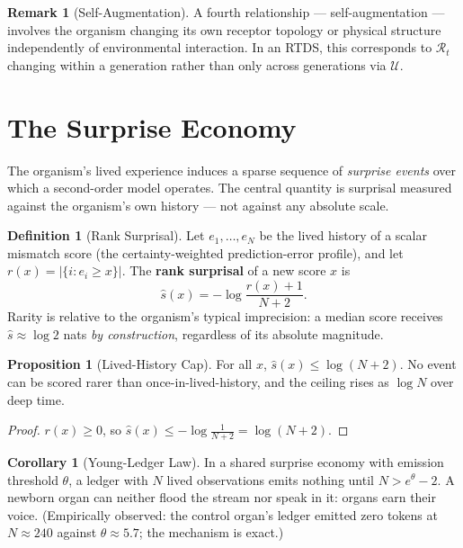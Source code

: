 \documentclass[12pt]{article}
\theoremstyle{definition}
\newtheorem{definition}{Definition}
\newtheorem{proposition}{Proposition}
\newtheorem{corollary}{Corollary}
\newtheorem{remark}{Remark}
\begin{document}
\begin{remark}[Self-Augmentation]
A fourth relationship --- self-augmentation --- involves the organism changing its own
receptor topology or physical structure independently of environmental interaction.
In an RTDS, this corresponds to $\mathcal{R}_t$ changing within a generation rather than
only across generations via $\mathcal{U}$.
\end{remark}

\section{The Surprise Economy}

The organism's lived experience induces a sparse sequence of \emph{surprise events} over
which a second-order model operates. The central quantity is surprisal measured against
the organism's own history --- not against any absolute scale.

\begin{definition}[Rank Surprisal]
Let $e_1, \ldots, e_N$ be the lived history of a scalar mismatch score (the
certainty-weighted prediction-error profile), and let $r(x) = |\{i : e_i \geq x\}|$.
The \textbf{rank surprisal} of a new score $x$ is
\[
\hat{s}(x) = -\log \frac{r(x) + 1}{N + 2}.
\]
Rarity is relative to the organism's typical imprecision: a median score receives
$\hat{s} \approx \log 2$ nats \emph{by construction}, regardless of its absolute magnitude.
\end{definition}

\begin{proposition}[Lived-History Cap]
For all $x$, $\hat{s}(x) \leq \log(N+2)$. No event can be scored rarer than
once-in-lived-history, and the ceiling rises as $\log N$ over deep time.
\end{proposition}
\begin{proof}
$r(x) \geq 0$, so $\hat{s}(x) \leq -\log \frac{1}{N+2} = \log(N+2)$.
\end{proof}

\begin{corollary}[Young-Ledger Law]
In a shared surprise economy with emission threshold $\theta$, a ledger with $N$ lived
observations emits nothing until $N > e^{\theta} - 2$. A newborn organ can neither flood
the stream nor speak in it: organs earn their voice. (Empirically observed: the control
organ's ledger emitted zero tokens at $N \approx 240$ against $\theta \approx 5.7$;
the mechanism is exact.)
\end{corollary}
\end{document}

